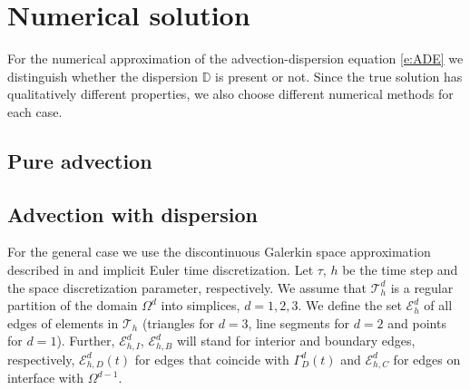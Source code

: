 \documentclass[a4paper]{article}
\def\D{{\tn D}}
\def\Eh{\mathcal E_h}       %
\def\Ehb{\mathcal E_{h,B}}  %
\def\Ehcom{\mathcal E_{h,C}}         %
\def\Ehdir{\mathcal E_{h,D}}         %
\def\Ehint{\mathcal E_{h,I}}       %
\def\Th{\mathcal T_h}       %
\def\tn#1{{\mathbb{#1}}}    %
\begin{document}
\section{Numerical solution}

For the numerical approximation of the advection-dispersion equation \eqref{e:ADE} we distinguish whether the dispersion $\D$ is present or not.
Since the true solution has qualitatively different properties, we also choose different numerical methods for each case.

\subsection{Pure advection}

\subsection{Advection with dispersion}

For the general case we use the discontinuous Galerkin space approximation described in \citet{ern_stephansen_zunino} and implicit Euler time discretization.
Let $\tau$, $h$ be the time step and the space discretization parameter, respectively.
We assume that $\Th^d$ is a regular partition of the domain $\Omega^d$ into simplices, $d=1,2,3$.
We define the set $\Eh^d$ of all edges of elements in $\Th$ (triangles for $d=3$, line segments for $d=2$ and points for $d=1$).
Further, $\Ehint^d$, $\Ehb^d$ will stand for interior and boundary edges, respectively, $\Ehdir^d(t)$ for edges that coincide with $\Gamma_D^d(t)$ and $\Ehcom^d$ for edges on interface with $\Omega^{d-1}$.
\end{document}
